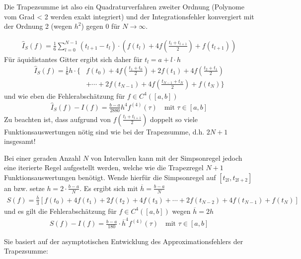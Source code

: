 Die Trapezsumme ist also ein
Quadraturverfahren zweiter Ordnung
(Polynome vom Grad < 2 werden exakt integriert) und der
Integrationsfehler konvergiert mit der Ordnung 2 (wegen $h^2$) gegen 0
für $N\to \infty$.

\begin{gather}
  \hat{I}_S(f) = \frac{1}{6}\sum_{l=0}^{N-1} (t_{l+1}-t_l)
  \cdot \left(f(t_l) +4f\left(\frac{t_l+t_{l+1}}{2}\right) + f(t_{l+1})
  \right)
  \label{VII.2.13}
\end{gather}
Für äquidistantes Gitter ergibt sich daher für $t_l=a+l\cdot h$
\begin{align}\nonumber
  \hat{I}_S(f) = \frac{1}{6}h\cdot
  \bigg\{
  &f(t_0)+4f\left(\frac{t_1+t_0}{2}\right) 
  +2f(t_1) + 4f\left(\frac{t_2+t_1}{2}\right)\\
   &+\dotsb +2f(t_{N-1})
  +4f\left(\frac{t_{N-1}+t_N}{2}\right)
     + f(t_N)
     \bigg\}
     \label{VII.2.14}
\end{align}
und wie eben die Fehlerabschätzung
für $f\in C^4([a,b])$
\begin{gather}
  \hat{I}_S(f) -I(f) =
  \frac{b-a}{2880}h^4f^{(4)}(\tau)
  \quad \text{mit } \tau\in[a,b]
  \label{VII.2.15}
\end{gather}
Zu beachten ist, dass aufgrund von
$f\left(\frac{t_l+t_{l+1}}{2}\right)$
doppelt so viele Funktionsauswertungen nötig sind
wie bei der Trapezsumme, d.h. $2N+1$ insgesamt!

Bei einer geraden Anzahl $N$ von Intervallen kann mit der
Simpsonregel jedoch eine iterierte Regel aufgestellt werden,
welche wie die Trapezregel $N+1$ Funktionsauswertungen benötigt.
Wende hierfür die Simpsonregel auf $[t_{2l}, t_{2l+2}]$ an
bzw. setze $h=2\cdot\frac{b-a}{N}$.
Es ergibt sich mit $\overline{h}= \frac{b-a}{N}$
\begin{gather}
  S(f) = \frac{\overline{h}}{3}\left[
    f(t_0)+4f(t_1) + 2f(t_2) + 4f(t_3) +
    \dotsb + 2f(t_{N-2}) + 4f(t_{N-1}) + f(t_N)
  \right]
  \label{VII.2.16}
\end{gather}
und es gilt die Fehlerabschätzung für $f\in C^4([a,b])$
wegen $\overline{h}= 2h$
\begin{gather}
  S(f)-I(f)=
  \frac{b-a}{180}\cdot\overline{h}^4f^{(4)}(\tau)
  \quad \text{mit } \tau \in[a,b]
  \label{VII.2.17}
\end{gather}


Sie basiert auf der asymptotischen Entwicklung 
des Approximationsfehlers der Trapezsumme:


